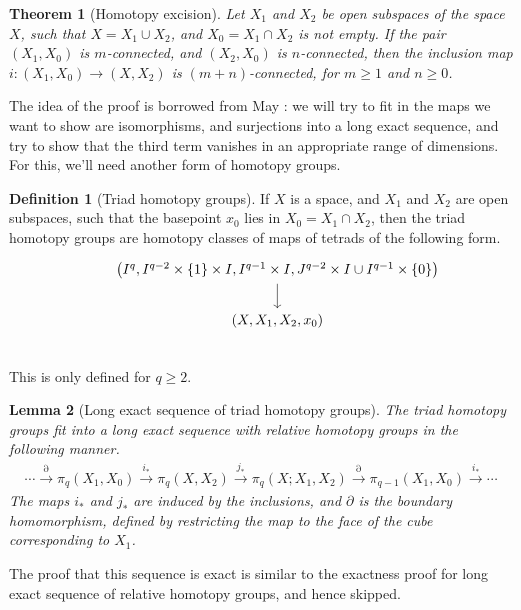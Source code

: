 \documentclass[12pt, notitlepage]{article}
\newtheorem{thm}{Theorem}[section]
\newtheorem{lem}[thm]{Lemma}
\theoremstyle{definition}
\newtheorem{defn}{Definition}[section]
\begin{document}
\begin{thm}[Homotopy excision]
  Let $X_1$ and $X_2$ be open subspaces of the space $X$, such that $X = X_1 \cup X_2$, and
  $X_0 = X_1 \cap X_2$ is not empty. If the pair $(X_1, X_0)$ is $m$-connected, and $(X_2, X_0)$ is
  $n$-connected, then the inclusion map $i: (X_1, X_0) \to (X, X_2)$ is $(m+n)$-connected, for
  $m \geq 1$ and $n \geq 0$.
\end{thm}
The idea of the proof is borrowed from May : we will try to fit in
the maps we want to show are isomorphisms, and surjections into a long exact sequence, and try to
show that the third term vanishes in an appropriate range of dimensions. For this, we'll need
another form of homotopy groups.

\begin{defn}[Triad homotopy groups]
  If $X$ is a space, and $X_1$ and $X_2$ are open subspaces, such that the basepoint $x_0$ lies in
  $X_0 = X_1 \cap X_2$, then the triad homotopy groups are homotopy classes of maps of tetrads of
  the following form.
  \[
    \begin{tikzcd}
      &\left( I^q, I^{q-2} \times \{1\} \times I, I^{q-1} \times I, J^{q-2} \times I \cup I^{q-1} \times \{0\} \right) \ar[d] \\
      &(X, X_1, X_2, x_0) \\
    \end{tikzcd}
  \]
  This is only defined for $q \geq 2$.
\end{defn}

\begin{lem}[Long exact sequence of triad homotopy groups]
  The triad homotopy groups fit into a long exact sequence with relative homotopy groups in the
  following manner.
  \begin{align*}
    \cdots \xrightarrow{\partial} \pi_q(X_1, X_0) \xrightarrow{i_{\ast}} \pi_q(X, X_2)
    \xrightarrow{j_{\ast}} \pi_q(X; X_1, X_2) \xrightarrow{\partial} \pi_{q-1}(X_1, X_0) \xrightarrow{i_{\ast}} \cdots
  \end{align*}
  The maps $i_{\ast}$ and $j_{\ast}$ are induced by the inclusions, and $\partial$ is the boundary
  homomorphism, defined by restricting the map to the face of the cube corresponding to $X_1$.
\end{lem}
The proof that this sequence is exact is similar to the exactness proof for long exact sequence of
relative homotopy groups, and hence skipped.
\end{document}
